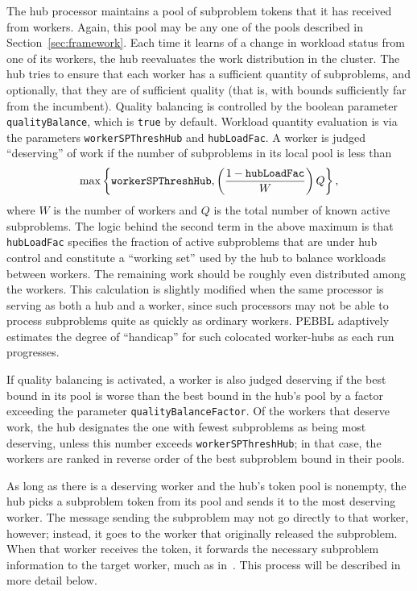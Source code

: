 The hub processor maintains a pool of subproblem tokens that it has
received from workers.  Again, this pool may be any one of the pools
described in Section~\ref{sec:framework}.  Each time it learns of a
change in workload status from one of its workers, the hub reevaluates
the work distribution in the cluster.  The hub tries to ensure that
each worker has a sufficient quantity of subproblems, and optionally,
that they are of sufficient quality (that is, with bounds sufficiently
far from the incumbent).  Quality balancing is controlled by the
boolean parameter \texttt{qualityBalance}, which is \texttt{true} by
default.  Workload quantity evaluation is via the parameters
\texttt{workerSPThreshHub} and \texttt{hubLoadFac}.  A worker is
judged ``deserving'' of work if the number of subproblems in its local
pool is less than
\[
\max\left\{\text{\texttt{workerSPThreshHub}}, 
           \left(\frac{1-\text{\texttt{hubLoadFac}}}{W}\right) Q
    \right\},
\]
where $W$ is the number of workers and $Q$ is the total number of
known active subproblems.  The logic behind the second term in the
above maximum is that \texttt{hubLoadFac} specifies the fraction of
active subproblems that are under hub control and constitute a
``working set'' used by the hub to balance workloads between workers.
The remaining work should be roughly even distributed among the
workers.  This calculation is slightly modified when the same
processor is serving as both a hub and a worker, since such processors
may not be able to process subproblems quite as quickly as ordinary
workers.  PEBBL adaptively estimates the degree of ``handicap'' for
such colocated worker-hubs as each run progresses.

If quality
balancing is activated, a worker is also judged deserving if the best
bound in its pool is worse than the best bound in the hub's pool by a
factor exceeding the parameter \texttt{qualityBalanceFactor}.  Of the
workers that deserve work, the hub designates the one with fewest
subproblems as being most deserving, unless this number exceeds
\texttt{workerSPThreshHub}; in that case, the workers are ranked in
reverse order of the best subproblem bound in their pools.

As long as there is a deserving worker and the hub's token pool is
nonempty, the hub picks a subproblem token from its pool and sends it
to the most deserving worker.  The message sending the subproblem may
not go directly to that worker, however; instead, it goes to the
worker that originally released the subproblem.  When that worker
receives the token, it forwards the necessary subproblem information
to the target worker, much as in~\cite{Eck94,Eck97,RRM93}.
This process will be described in more detail below.


